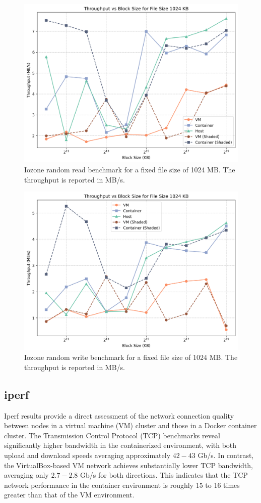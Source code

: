 \begin{figure}
    \centering
    \includegraphics[width=0.8\linewidth]{assets/random read_filesize_1024.png}
    \caption{Iozone random read benchmark for a fixed file size of 1024 MB. The throughput is reported in MB/s.}
    \label{fig:random_read_filesize_1024}
\end{figure}

\begin{figure}
    \centering
    \includegraphics[width=0.8\linewidth]{assets/random write_filesize_1024.png}
    \caption{Iozone random write benchmark for a fixed file size of 1024 MB. The throughput is reported in MB/s.}
    \label{fig:random_write_filesize_1024}
\end{figure}

\subsection{iperf}

Iperf results provide a direct assessment of the network connection quality between nodes in a virtual machine (VM) cluster and those in a Docker container cluster. The Transmission Control Protocol (TCP) benchmarks reveal significantly higher bandwidth in the containerized environment, with both upload and download speeds averaging approximately $42-43$ Gb/s. In contrast, the VirtualBox-based VM network achieves substantially lower TCP bandwidth, averaging only $2.7-2.8$ Gb/s for both directions. This indicates that the TCP network performance in the container environment is roughly 15 to 16 times greater than that of the VM environment.

